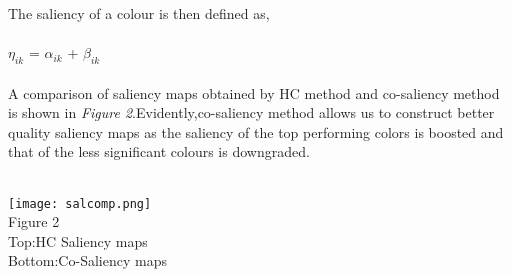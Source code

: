 \documentclass{article}
\begin{document}
The saliency of a colour is then defined as,\\\\
\hspace*{3 cm} $\eta_{ik}$ = $\alpha_{ik}$ + $\beta_{ik}$\\\\
A comparison of saliency maps obtained by HC method and co-saliency method is shown in \emph{Figure 2}.Evidently,co-saliency method allows us to construct better quality saliency maps as the saliency of the top performing colors is boosted and that of the less significant colours is downgraded. \\\\
\begin{center}
\texttt{[image: salcomp.png]}
\\Figure 2
\\Top:HC Saliency maps
\\Bottom:Co-Saliency maps
\end{center}
\newpage
\end{document}
